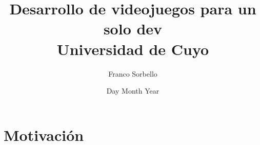 \documentclass[12pt]{report}
\title{
    {Desarrollo de videojuegos para un solo dev}\\
    {\large Universidad de Cuyo}\\
}
\author{Franco Sorbello}
\date{Day Month Year}
\begin{document}
\maketitle
\chapter{Motivación}

\printbibliography
\end{document}
